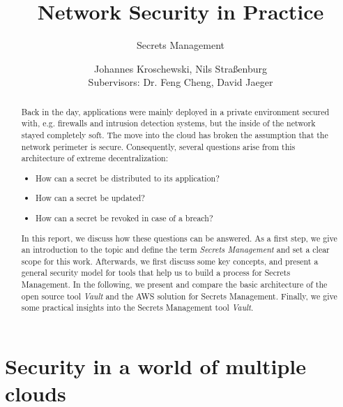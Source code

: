 \documentclass[runningheads]{llncs}
\begin{document}
\title{Network Security in Practice}
\subtitle{Secrets Management}

\author{Johannes Kroschewski, Nils Straßenburg \\
Subervisors: Dr. Feng Cheng, David Jaeger}



\maketitle              

\begin{abstract}
Back in the day, applications were mainly deployed in a private environment secured with, e.g. firewalls and intrusion detection systems, but the inside of the network stayed completely soft. The move into the cloud has broken the assumption that the network perimeter is secure. Consequently, several questions arise from this architecture of extreme decentralization:

\begin{itemize}  
    \setlength\itemsep{1mm}
    \item How can a secret be distributed to its application?
    \item How can a secret be updated?
    \item How can a secret be revoked in case of a breach?
\end{itemize}

In this report, we discuss how these questions can be answered. As a first step, we give an introduction to the topic and define the term \textit{Secrets Management} and set a clear scope for this work. Afterwards, we first discuss some key concepts, and present a general security model for tools that help us to build a process for Secrets Management. In the following, we present and compare the basic architecture of the open source tool \textit{Vault} and the AWS solution for Secrets Management. Finally, we give some practical insights into the Secrets Management tool \textit{Vault}.

\end{abstract}

\newpage

\section{Security in a world of multiple clouds}
\end{document}
